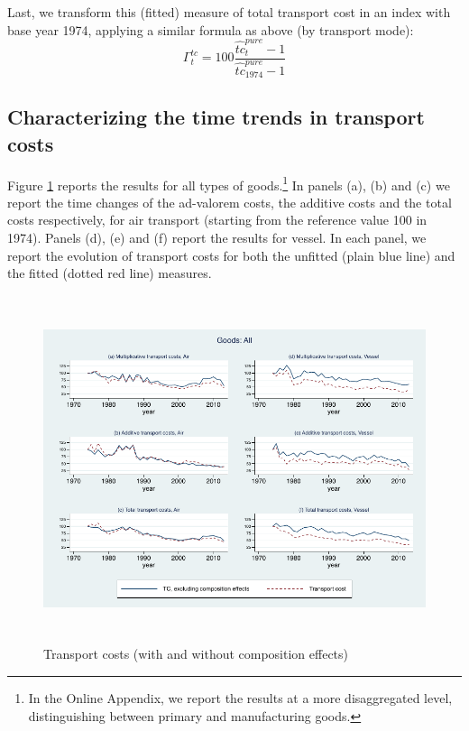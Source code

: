 \documentclass[a4paper,11pt]{article}
\begin{document}
Last, we transform this (fitted) measure of total transport cost in an index with base year 1974, applying a similar formula as above (by transport mode):
$$\Gamma^{tc}_t = 100\frac{\widehat{tc}^{pure}_t -1 }{\widehat{tc}^{pure}_{1974}-1}$$


\subsection{Characterizing the time trends in transport costs}
Figure \ref{fig:totalTC_compeffects_excl} reports the results for all types of goods.\footnote{In the Online Appendix, we report the results at a more disaggregated level, distinguishing between primary and manufacturing goods.} In panels (a), (b) and (c) we report the time changes of the ad-valorem costs, the additive costs and the total costs respectively, for air transport (starting from the reference value 100 in 1974).
Panels (d), (e) and (f) report the results for vessel.
In each panel, we report the evolution of transport costs for both the unfitted (plain blue line) and the fitted (dotted red line) measures.


\begin{figure}[htbp]
\caption{Transport costs (with and without composition effects)}
\label{fig:totalTC_compeffects_excl}
\begin{center}
\includegraphics[height=4in]
{graph_composition_all.pdf}
\end{center}
\end{figure}
\end{document}
